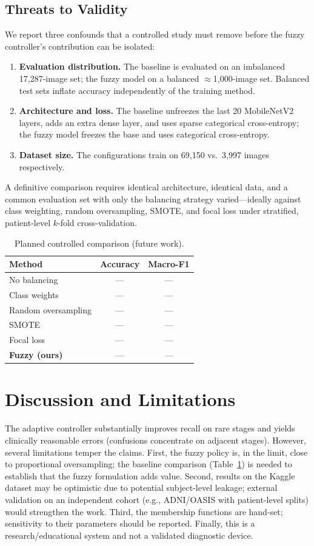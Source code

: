 \documentclass[journal]{IEEEtran}
\begin{document}
\subsection{Threats to Validity}
We report three confounds that a controlled study must remove before the fuzzy
controller's contribution can be isolated:
\begin{enumerate}
  \item \textbf{Evaluation distribution.} The baseline is evaluated on an
  imbalanced 17{,}287-image set; the fuzzy model on a balanced
  $\approx$1{,}000-image set. Balanced test sets inflate accuracy independently
  of the training method.
  \item \textbf{Architecture and loss.} The baseline unfreezes the last 20
  MobileNetV2 layers, adds an extra dense layer, and uses sparse categorical
  cross-entropy; the fuzzy model freezes the base and uses categorical
  cross-entropy.
  \item \textbf{Dataset size.} The configurations train on 69{,}150 vs.\ 3{,}997
  images respectively.
\end{enumerate}
A definitive comparison requires identical architecture, identical data, and a
common evaluation set with only the balancing strategy varied---ideally against
class weighting, random oversampling, SMOTE, and focal loss under stratified,
patient-level $k$-fold cross-validation.
\begin{table}[t]
\caption{Planned controlled comparison (future work).}
\label{tab:baselines}
\centering
\begin{tabular}{lcc}
\toprule
Method & Accuracy & Macro-F1 \\
\midrule
No balancing            & --- & --- \\
Class weights           & --- & --- \\
Random oversampling     & --- & --- \\
SMOTE                   & --- & --- \\
Focal loss              & --- & --- \\
\textbf{Fuzzy (ours)}   & --- & --- \\
\bottomrule
\end{tabular}
\end{table}

\section{Discussion and Limitations}
The adaptive controller substantially improves recall on rare stages and yields
clinically reasonable errors (confusions concentrate on adjacent stages).
However, several limitations temper the claims. First, the fuzzy policy is, in
the limit, close to proportional oversampling; the baseline comparison
(Table~\ref{tab:baselines}) is needed to establish that the fuzzy formulation
adds value. Second, results on the Kaggle dataset may be optimistic due to
potential subject-level leakage; external validation on an independent cohort
(e.g., ADNI/OASIS with patient-level splits) would strengthen the work. Third,
the membership functions are hand-set; sensitivity to their parameters should be
reported. Finally, this is a research/educational system and not a validated
diagnostic device.
\end{document}
